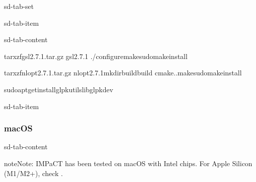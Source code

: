 \documentclass[a4paper,10pt,english]{sphinxmanual}
\begin{document}
\begin{sphinxuseclass}{sd-tab-set}
\begin{sphinxuseclass}{sd-tab-item}
\begin{sphinxuseclass}{sd-tab-content}
\sphinxAtStartPar
{}

\begin{sphinxVerbatim}[commandchars=\\\{\}]
tar\PYGZhy{}xzfgsl\PYGZhy{}2.7.1.tar.gz
gsl\PYGZhy{}2.7.1
./configuremakesudomakeinstall
\end{sphinxVerbatim}

\sphinxAtStartPar
{}

\begin{sphinxVerbatim}[commandchars=\\\{\}]
tar\PYGZhy{}xzfnlopt\PYGZhy{}2.7.1.tar.gz
nlopt\PYGZhy{}2.7.1mkdirbuildbuild
cmake..makesudomakeinstall
\end{sphinxVerbatim}

\sphinxAtStartPar
{}

\begin{sphinxVerbatim}[commandchars=\\\{\}]
sudoapt\PYGZhy{}getinstallglpk\PYGZhy{}utilslibglpk\PYGZhy{}dev
\end{sphinxVerbatim}

\end{sphinxuseclass}
\end{sphinxuseclass}
\begin{sphinxuseclass}{sd-tab-item}\subsubsection*{macOS}

\begin{sphinxuseclass}{sd-tab-content}
\begin{sphinxadmonition}{note}{Note:}
\sphinxAtStartPar
IMPaCT has been tested on macOS with Intel chips. For Apple Silicon (M1/M2+),
check .
\end{sphinxadmonition}


\end{sphinxuseclass}
\end{sphinxuseclass}
\end{sphinxuseclass}
\end{document}

